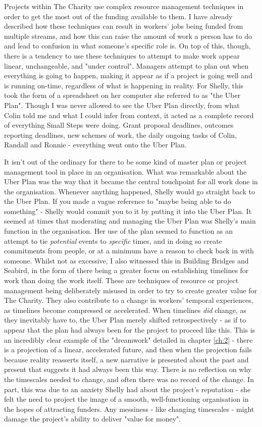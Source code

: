 Projects within The Charity use complex resource management techniques in order to get the most out of the funding available to them. I have already described how these techniques can result in workers’ jobs being funded from multiple streams, and how this can raise the amount of work a person has to do and lead to confusion in what someone’s specific role is. On top of this, though, there is a tendency to use these techniques to attempt to make work appear  linear, unchangeable, and "under control". Managers attempt to plan out when everything is going to happen, making it appear as if a project is going well and is running on-time, regardless of what is happening in reality. For Shelly, this took the form of a spreadsheet on her computer she referred to as "the Uber Plan". Though I was never allowed to see the Uber Plan directly, from what Colin told me and what I could infer from context, it acted as a complete record of everything Small Steps were doing. Grant proposal deadlines, outcomes reporting deadlines, new schemes of work, the daily ongoing tasks of Colin, Randall and Ronnie - everything went onto the Uber Plan. 

It isn’t out of the ordinary for there to be some kind of master plan or project management tool in place in an organisation. What was remarkable about the Uber Plan was the way that it became the central touchpoint for all work done in the organisation. Whenever anything happened, Shelly would go straight back to the Uber Plan. If you made a vague reference to "maybe being able to do something" - Shelly would commit you to it by putting it into the Uber Plan. It seemed at times that moderating and managing the Uber Plan was Shelly’s main function in the organisation. Her use of the plan seemed to function as an attempt to tie \textit{potential} events to \textit{specific} times, and in doing so create commitments from people, or at a minimum have a reason to check back in with someone. Whilst not as excessive, I also witnessed this in Building Bridges and Seabird, in the form of there being a greater focus on establishing timelines for work than doing the work itself. These are techniques of resource or project management being deliberately misused in order to try to create greater value for The Charity. They also contribute to a change in workers' temporal experiences, as timelines become compressed or accelerated. When timelines \emph{did} change, as they inevitably have to, the Uber Plan merely shifted retrospectively - as if to appear that the plan had always been for the project to proceed like this. This is an incredibly clear example of the "dreamwork" detailed in chapter \ref{ch:2} - there is a projection of a linear, accelerated future, and then when the projection fails because reality reasserts itself, a new narrative is presented about the past and present that suggests it had always been this way. There is no reflection on why the timescales needed to change, and often there was no record of the change. In part, this was due to an anxiety Shelly had about the project's reputation - she felt the need to project the image of a smooth, well-functioning organisation in the hopes of attracting funders. Any messiness - like changing timescales - might damage the project's ability to deliver "value for money". 

